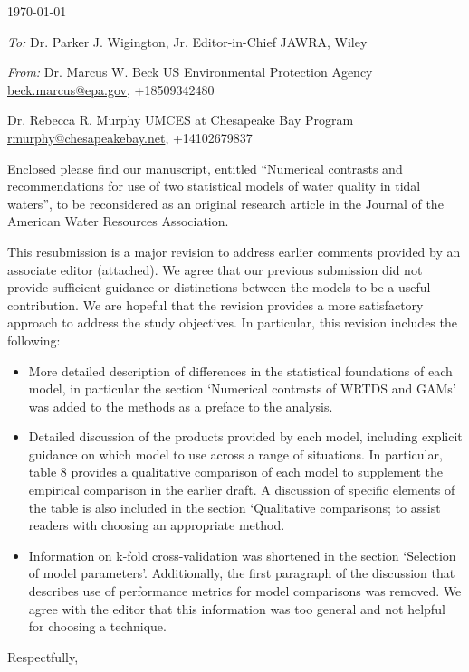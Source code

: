 \documentclass[a4paper,12pt]{article}
\begin{document}
\renewcommand{\rmdefault}{ptm}
\pagestyle{empty} 

\setlength{\parindent}{0mm} 
\setlength{\parskip}{5mm}

\begin{flushright}
\today
\end{flushright}

\emph{To:}\newline
Dr. Parker J. Wigington, Jr.\newline
Editor-in-Chief\newline
JAWRA, Wiley

\emph{From:}\newline
Dr. Marcus W. Beck\newline
US Environmental Protection Agency\newline
\href{mailto:beck.marcus@epa.gov}{beck.marcus@epa.gov}, +18509342480

Dr. Rebecca R. Murphy\newline
UMCES at Chesapeake Bay Program\newline
\href{mailto:rmurphy@chesapeakebay.net}{rmurphy@chesapeakebay.net}, +14102679837 \vspace{14.5pt}

Enclosed please find our manuscript, entitled ``Numerical contrasts and recommendations for use of two statistical models of water quality in tidal waters'', to be reconsidered as an original research article in the Journal of the American Water Resources Association.  

This resubmission is a major revision to address earlier comments provided by an associate editor (attached).  We agree that our previous submission did not provide sufficient guidance or distinctions between the models to be a useful contribution.  We are hopeful that the revision provides a more satisfactory approach to address the study objectives.  In particular, this revision includes the following: 
\begin{itemize}
\item More detailed description of differences in the statistical foundations of each model, in particular the section `Numerical contrasts of WRTDS and GAMs' was added to the methods as a preface to the analysis.  
\item Detailed discussion of the products provided by each model, including explicit guidance on which model to use across a range of situations.  In particular, table 8 provides a qualitative comparison of each model to supplement the empirical comparison in the earlier draft.  A discussion of specific elements of the table is also included in the section `Qualitative comparisons; to assist readers with choosing an appropriate method.   
\item Information on k-fold cross-validation was shortened in the section `Selection of model parameters'.  Additionally, the first paragraph of the discussion that describes use of performance metrics for model comparisons was removed.  We agree with the editor that this information was too general and not helpful for choosing a technique.
\end{itemize}
\hspace{4.5in}Respectfully,
\end{document}
